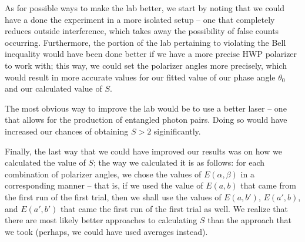 \documentclass[twocolumn,amsmath,amssymb,pra]{revtex4-2}
\begin{document}
As for possible ways to make the lab better, we start by noting that we could have a done the experiment in a more isolated setup -- one that completely reduces outside interference, which takes away the possibility of false counts occurring. Furthermore, the portion of the lab pertaining to violating the Bell inequality would have been done better if we have a more precise HWP polarizer to work with; this way, we could set the polarizer angles more precisely, which would result in more accurate values for our fitted value of our phase angle $\theta_{0}$ and our calculated value of $S$.

The most obvious way to improve the lab would be to use a better laser -- one that allows for the production of entangled photon pairs. Doing so would have increased our chances of obtaining $S > 2$ siginificantly. 

Finally, the last way that we could have improved our results was on how we calculated the value of $S$; the way we calculated it is as follows: for each combination of polarizer angles, we chose the values of $E(\alpha, \beta)$ in a corresponding manner -- that is, if we used the value of $E(a, b)$ that came from the first run of the first trial, then we shall use the values of $E(a, b')$, $E(a', b)$, and $E(a', b')$ that came the first run of the first trial as well. We realize that there are most likely better approaches to calculating $S$ than the approach that we took (perhaps, we could have used averages instead).



\end{document}
